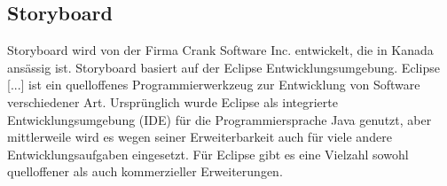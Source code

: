 \subsection{Storyboard}
Storyboard wird von der Firma Crank Software Inc. entwickelt, die in Kanada ansässig ist. Storyboard basiert auf der Eclipse Entwicklungsumgebung.
\glqq Eclipse [...] ist ein quelloffenes Programmierwerkzeug zur Entwicklung von Software verschiedener Art. Ursprünglich wurde Eclipse als integrierte Entwicklungsumgebung (IDE) für die Programmiersprache Java genutzt, aber mittlerweile wird es wegen seiner Erweiterbarkeit auch für viele andere Entwicklungsaufgaben eingesetzt. Für Eclipse gibt es eine Vielzahl sowohl quelloffener als auch kommerzieller Erweiterungen. \grqq \cite{wiki_storyboard}






